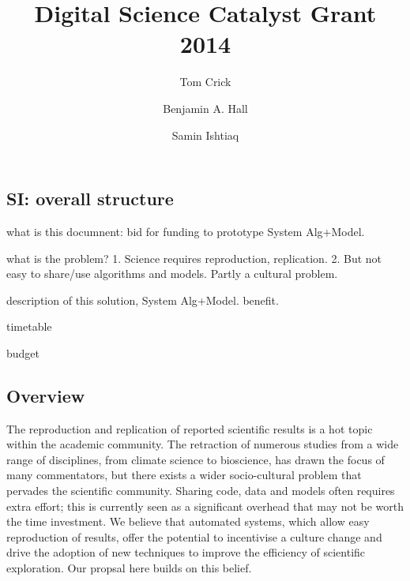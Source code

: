\documentclass[a4paper,11pt]{article}
\title{\vspace{-4em}Digital Science Catalyst Grant 2014}
\author[1]{Tom Crick}
\author[2]{Benjamin A. Hall}
\author[3]{Samin Ishtiaq}
\affil[1]{Department of Computing \& Information Systems, Cardiff Metropolitan University}
\affil[2]{MRC Cancer Unit, University of Cambridge}
\affil[3]{Microsoft Research Cambridge}
\affil[1]{\protect\url{tcrick@cardiffmet.ac.uk}}
\date{ }
\begin{document}
\maketitle





\subsection{SI: overall structure}

what is this documnent: bid for funding to prototype System Alg+Model. 

what is the problem?
1. Science requires reproduction, replication. 
2. But not easy to share/use algorithms and models. Partly a cultural problem. 


description of this solution, System Alg+Model. 
benefit. 

timetable

budget



\subsection*{Overview}

The reproduction and replication of reported scientific results is a
hot topic within the academic community. The retraction of numerous
studies from a wide range of disciplines, from climate science to
bioscience, has drawn the focus of many commentators, but there exists
a wider socio-cultural problem that pervades the scientific community.
Sharing code, data and models often requires extra effort; this is
currently seen as a significant overhead that may not be worth the
time investment.
%
We believe that automated systems, which allow easy reproduction of results, offer the
potential to incentivise a culture change and drive the adoption of
new techniques to improve the efficiency of scientific exploration. 
Our propsal here builds on this belief. 


\end{document}
